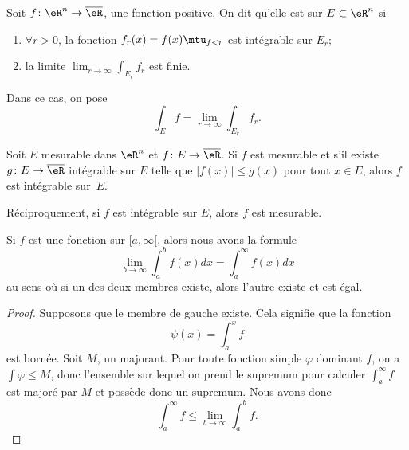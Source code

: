 Soit $f\colon \eR^n\to \overline{ \eR }$, une fonction positive. On dit qu'elle est  sur $E\subset\eR^n$ si
\begin{enumerate}
    \item $\forall r>0$, la fonction $f_r(x)=f(x)\mtu_{f<r}$ est intégrable sur $E_r$;
\item la limite $\lim_{r\to\infty}\int_{E_r}f_r$ est finie.
\end{enumerate}
Dans ce cas, on pose
\begin{equation}
	\int_Ef=\lim_{r\to\infty}\int_{E_r}f_r.
\end{equation}

\begin{theorem}	\label{ThoFnTestIntnnBorn}
Soit $E$ mesurable dans $\eR^n$ et $f\colon E\to \overline{ \eR }$. Si $f$ est mesurable et s'il existe $g\colon E\to \overline{ \eR }$ intégrable sur $E$ telle que $| f(x) |\leq g(x)$ pour tout $x\in E$, alors $f$ est intégrable sur~$E$.

Réciproquement, si $f$ est intégrable sur $E$, alors $f$ est mesurable.
\end{theorem}

\begin{lemma}\label{LemTHBSEs}
    Si \( f\) est une fonction sur \( \mathopen[ a , \infty [\), alors nous avons la formule
    \begin{equation}
        \lim_{b\to \infty}\int_a^bf(x)dx=\int_a^{\infty}f(x)dx
    \end{equation}
    au sens où si un des deux membres existe, alors l'autre existe et est égal.
\end{lemma}

\begin{proof}
    Supposons que le membre de gauche existe. Cela signifie que la fonction
    \begin{equation}
        \psi(x)=\int_a^xf
    \end{equation}
    est bornée. Soit \( M\), un majorant. Pour toute fonction simple \( \varphi\) dominant \( f\), on a \( \int\varphi\leq M\), donc l'ensemble sur lequel on prend le supremum pour calculer \( \int_a^{\infty}f\) est majoré par \( M\) et possède donc un supremum. Nous avons donc
    \begin{equation}
        \int_a^{\infty}f\leq\lim_{b\to\infty}\int_a^bf.
    \end{equation}
\end{proof}


